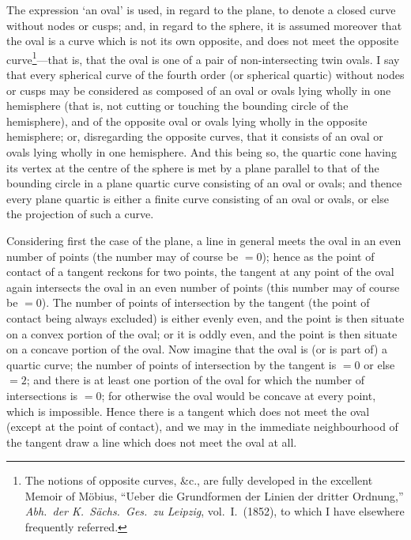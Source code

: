 \documentclass[11pt]{article}
\begin{document}
\medskip{}

\medskip

The expression `an oval' is used, in regard to the plane, to denote a closed curve without nodes or cusps; and, in regard to the sphere, it is assumed moreover that the oval is a curve which is not its own opposite, and does not meet the opposite curve\footnote{The notions of opposite curves, \&c., are fully developed in the excellent Memoir of M\"obius, ``Ueber die Grundformen der Linien der dritter Ordnung,'' \textit{Abh.\ der K.\ S\"achs.\ Ges.\ zu Leipzig}, vol.\ I.\ (1852), to which I have elsewhere frequently referred.}---that is, that the oval is one of a pair of non-intersecting twin ovals. I say that every spherical curve of the fourth order (or spherical quartic) without nodes or cusps may be considered as composed of an oval or ovals lying wholly in one hemisphere (that is, not cutting or touching the bounding circle of the hemisphere), and of the opposite oval or ovals lying wholly in the opposite hemisphere; or, disregarding the opposite curves, that it consists of an oval or ovals lying wholly in one hemisphere. And this being so, the quartic cone having its vertex at the centre of the sphere is met by a plane parallel to that of the bounding circle in a plane quartic curve consisting of an oval or ovals; and thence every plane quartic is either a finite curve consisting of an oval or ovals, or else the projection of such a curve.

Considering first the case of the plane, a line in general meets the oval in an even number of points (the number may of course be $=0$); hence as the point of contact of a tangent reckons for two points, the tangent at any point of the oval again intersects the oval in an even number of points (this number may of course be $=0$). The number of points of intersection by the tangent (the point of contact being always excluded) is either evenly even, and the point is then situate on a convex portion of the oval; or it is oddly even, and the point is then situate on a concave portion of the oval. Now imagine that the oval is (or is part of) a quartic curve; the number of points of intersection by the tangent is $=0$ or else $=2$; and there is at least one portion of the oval for which the number of intersections is $=0$; for otherwise the oval would be concave at every point, which is impossible. Hence there is a tangent which does not meet the oval (except at the point of contact), and we may in the immediate neighbourhood of the tangent draw a line which does not meet the oval at all.
\end{document}
